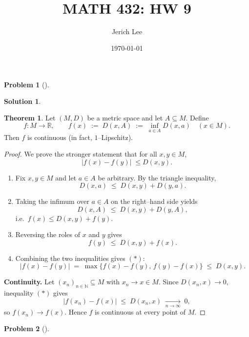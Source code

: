 \documentclass[12pt]{article}
\title{MATH 432: HW 9}
\author{Jerich Lee}
\date{\today}
\theoremstyle{definition} %
\newtheorem{solution}{Solution}
\newtheorem{problem}{Problem}
\newtheorem{theorem}{Theorem}
\theoremstyle{plain} %
\begin{document}
\maketitle
\begin{problem}[]
  
\end{problem}
\begin{solution}
  \begin{theorem}
    Let $(M,D)$ be a metric space and let $A\subseteq M$.  
    Define
    \[
    f:M\longrightarrow\mathbb{R},\qquad 
    f(x)\;:=\;D(x,A)\;:=\;\inf_{a\in A}D(x,a)\quad(x\in M).
    \]
    Then $f$ is continuous (in fact, $1$–Lipschitz).
    \end{theorem}
    
    \begin{proof}
    We prove the stronger statement that for all $x,y\in M$,
    \[
    \lvert f(x)-f(y)\rvert\;\le D(x,y).
    \tag{$\ast$}
    \]
    
    \begin{enumerate}
        \item Fix $x,y\in M$ and let $a\in A$ be arbitrary.  
              By the triangle inequality,
              \[
                  D(x,a)\;\le\;D(x,y)+D(y,a).
              \]
        \item Taking the infimum over $a\in A$ on the right–hand side yields
              \[
                  D(x,A)\;\le\;D(x,y)+D(y,A),
              \]
              i.e.\ $f(x)\le D(x,y)+f(y)$.
        \item Reversing the roles of $x$ and $y$ gives
              \[
                  f(y)\;\le\;D(x,y)+f(x).
              \]
        \item Combining the two inequalities gives $(\ast)$:
              \[
                  \lvert f(x)-f(y)\rvert
                  \;=\;\max\{f(x)-f(y),\,f(y)-f(x)\}
                  \;\le\;D(x,y).
              \]
    \end{enumerate}
    
    \smallskip
    \noindent\textbf{Continuity.}
    Let $(x_n)_{n\in\mathbb{N}}\subseteq M$ with $x_n\to x\in M$.  
    Since $D(x_n,x)\to 0$, inequality $(\ast)$ gives
    \[
    \lvert f(x_n)-f(x)\rvert\;\le\;D(x_n,x)\;\xrightarrow[n\to\infty]{}\;0,
    \]
    so $f(x_n)\to f(x)$.  
    Hence $f$ is continuous at every point of $M$.
    \end{proof} 
\end{solution}
\begin{problem}[]
  
\end{problem}
\end{document}
